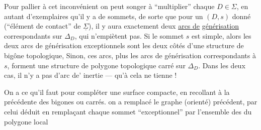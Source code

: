 Pour pallier à cet inconvénient on peut songer à ``multiplier'' chaque $D\in\Sigma$, en autant d'exemplaires qu'il y a de sommets, de sorte que  pour un $(D,s)$ donné (``élément de contact'' de $\underline\Sigma$), il y aura exactement deux \uline{arcs de}  \uline{générisation}  correspondants sur $\Delta_D$, qui n'empiètent pas. Si le sommet $s$ est simple, alors les deux arcs de générisation exceptionnels sont les deux côtés d'une structure de bigône topologique, Sinon, ces arcs, plus les  arcs de générisation  correspondants à $s$, forment une structure de polygone topologique carré sur $\Delta_D$.  Dans les deux cas, il n'y a pas d'arc de' inertie --- qu'à cela ne tienne !

On a  ce qu'il faut pour compléter une surface compacte, en recollant à la précédente des bigones ou carrés.    on a remplacé le graphe (orienté) précédent, par celui déduit en remplaçant chaque sommet ``exceptionnel'' par l'ensemble des  du polygone local
